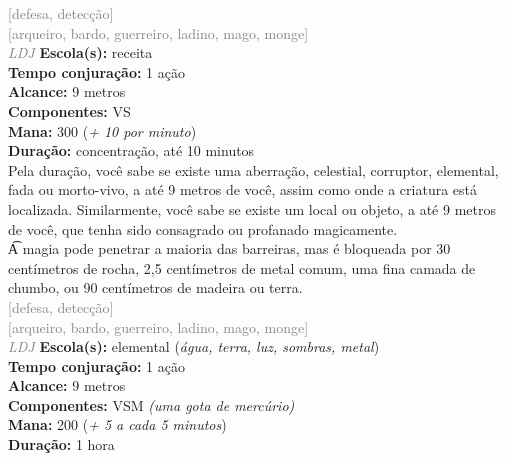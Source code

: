 \documentclass{RPG_Adventure}[2021/10/20]
\begin{document}
{\scriptsize \textcolor{gray}{[defesa, detecção]\\}}
{\scriptsize \textcolor{gray}{[arqueiro, bardo, guerreiro, ladino, mago, monge]\\}}
{\tiny \textcolor{gray}{\textit{LDJ}}}
{\small \t \textbf{Escola(s):} receita\\\t \textbf{Tempo conjuração:} 1 ação\\\t \textbf{Alcance:} 9 metros\\\t \textbf{Componentes:} VS\\\t \textbf{Mana:} 300 (\textit{+ 10 por minuto})\\\t \textbf{Duração:} concentração, até 10 minutos\\}
{\normalsize Pela duração, você sabe se existe uma aberração, celestial, corruptor, elemental, fada ou morto-vivo, a até 9 metros de você, assim como onde a criatura está localizada. Similarmente, você sabe se existe um local ou objeto, a até 9 metros de você, que tenha sido consagrado ou profanado magicamente.\\\t A magia pode penetrar a maioria das barreiras, mas é bloqueada por 30 centímetros de rocha, 2,5 centímetros de metal comum, uma fina camada de chumbo, ou 90 centímetros de madeira ou terra.\\}
{\scriptsize \textcolor{gray}{[defesa, detecção]\\}}
{\scriptsize \textcolor{gray}{[arqueiro, bardo, guerreiro, ladino, mago, monge]\\}}
{\tiny \textcolor{gray}{\textit{LDJ}}}
{\small \t \textbf{Escola(s):} elemental (\textit{água, terra, luz, sombras, metal})\\\t \textbf{Tempo conjuração:} 1 ação\\\t \textbf{Alcance:} 9 metros\\\t \textbf{Componentes:} VSM \textit{(uma gota de mercúrio)}\\\t \textbf{Mana:} 200 (\textit{+ 5 a cada 5 minutos})\\\t \textbf{Duração:} 1 hora\\}
\end{document}

